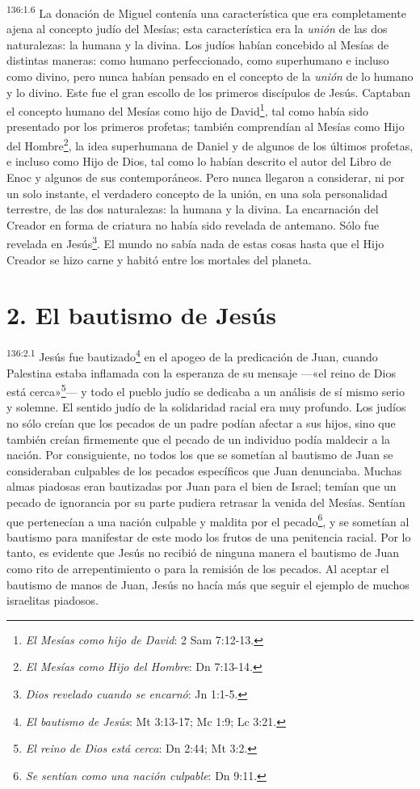 \par 
\textsuperscript{136:1.6} La donación de Miguel contenía una característica que era completamente ajena al concepto judío del Mesías; esta característica era la \textit{unión} de las dos naturalezas: la humana y la divina. Los judíos habían concebido al Mesías de distintas maneras: como humano perfeccionado, como superhumano e incluso como divino, pero nunca habían pensado en el concepto de la \textit{unión} de lo humano y lo divino. Este fue el gran escollo de los primeros discípulos de Jesús. Captaban el concepto humano del Mesías como hijo de David\footnote{\textit{El Mesías como hijo de David}: 2 Sam 7:12-13.}, tal como había sido presentado por los primeros profetas; también comprendían al Mesías como Hijo del Hombre\footnote{\textit{El Mesías como Hijo del Hombre}: Dn 7:13-14.}, la idea superhumana de Daniel y de algunos de los últimos profetas, e incluso como Hijo de Dios, tal como lo habían descrito el autor del Libro de Enoc y algunos de sus contemporáneos. Pero nunca llegaron a considerar, ni por un solo instante, el verdadero concepto de la unión, en una sola personalidad terrestre, de las dos naturalezas: la humana y la divina. La encarnación del Creador en forma de criatura no había sido revelada de antemano. Sólo fue revelada en Jesús\footnote{\textit{Dios revelado cuando se encarnó}: Jn 1:1-5.}. El mundo no sabía nada de estas cosas hasta que el Hijo Creador se hizo carne y habitó entre los mortales del planeta.

\section*{2. El bautismo de Jesús}
\par 
\textsuperscript{136:2.1} Jesús fue bautizado\footnote{\textit{El bautismo de Jesús}: Mt 3:13-17; Mc 1:9; Lc 3:21.} en el apogeo de la predicación de Juan, cuando Palestina estaba inflamada con la esperanza de su mensaje ---«el reino de Dios está cerca»\footnote{\textit{El reino de Dios está cerca}: Dn 2:44; Mt 3:2.}--- y todo el pueblo judío se dedicaba a un análisis de sí mismo serio y solemne. El sentido judío de la solidaridad racial era muy profundo. Los judíos no sólo creían que los pecados de un padre podían afectar a sus hijos, sino que también creían firmemente que el pecado de un individuo podía maldecir a la nación. Por consiguiente, no todos los que se sometían al bautismo de Juan se consideraban culpables de los pecados específicos que Juan denunciaba. Muchas almas piadosas eran bautizadas por Juan para el bien de Israel; temían que un pecado de ignorancia por su parte pudiera retrasar la venida del Mesías. Sentían que pertenecían a una nación culpable y maldita por el pecado\footnote{\textit{Se sentían como una nación culpable}: Dn 9:11.}, y se sometían al bautismo para manifestar de este modo los frutos de una penitencia racial. Por lo tanto, es evidente que Jesús no recibió de ninguna manera el bautismo de Juan como rito de arrepentimiento o para la remisión de los pecados. Al aceptar el bautismo de manos de Juan, Jesús no hacía más que seguir el ejemplo de muchos israelitas piadosos.

